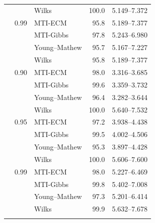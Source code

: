\begin{longtable}{@{}rrlrr@{}}
 &  & Wilks & 100.0 & 5.149--7.372 \\
\addlinespace[0.3em]
500 & 0.99 & MTI-ECM & 95.8 & 5.189--7.377 \\
 &  & MTI-Gibbs & 97.8 & 5.243--6.980 \\
 &  & Young--Mathew & 95.7 & 5.167--7.227 \\
 &  & Wilks & 95.8 & 5.189--7.377 \\
\addlinespace[0.3em]
1000 & 0.90 & MTI-ECM & 98.0 & 3.316--3.685 \\
 &  & MTI-Gibbs & 99.6 & 3.359--3.732 \\
 &  & Young--Mathew & 96.4 & 3.282--3.644 \\
 &  & Wilks & 100.0 & 5.640--7.532 \\
\addlinespace[0.3em]
1000 & 0.95 & MTI-ECM & 97.2 & 3.938--4.438 \\
 &  & MTI-Gibbs & 99.5 & 4.002--4.506 \\
 &  & Young--Mathew & 95.3 & 3.897--4.428 \\
 &  & Wilks & 100.0 & 5.606--7.600 \\
\addlinespace[0.3em]
1000 & 0.99 & MTI-ECM & 98.0 & 5.227--6.469 \\
 &  & MTI-Gibbs & 99.8 & 5.402--7.008 \\
 &  & Young--Mathew & 97.3 & 5.201--6.414 \\
 &  & Wilks & 99.9 & 5.632--7.678 \\
\addlinespace[0.3em]
\end{longtable}
\clearpage

